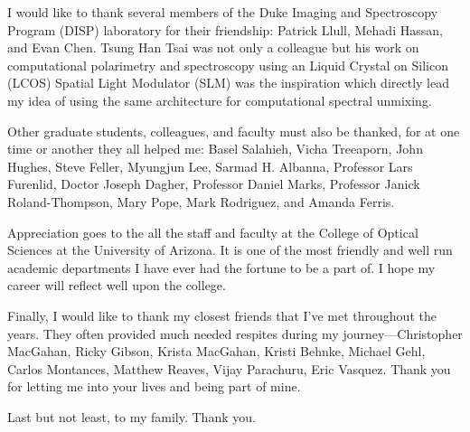 I would like to thank several members of the Duke Imaging and Spectroscopy Program (DISP) laboratory for their friendship: Patrick Llull, Mehadi Hassan, and Evan Chen. Tsung Han Tsai was not only a colleague but his work on computational polarimetry and spectroscopy using an Liquid Crystal on Silicon (LCOS) Spatial Light Modulator (SLM) was the inspiration which directly lead my idea of using the same architecture for computational spectral unmixing. 

Other graduate students, colleagues, and faculty must also be thanked, for at one time or another they all helped me: Basel Salahieh, Vicha Treeaporn, John Hughes, Steve Feller, Myungjun Lee, Sarmad H. Albanna, Professor Lars Furenlid, Doctor Joseph Dagher, Professor Daniel Marks, Professor Janick Roland-Thompson, Mary Pope, Mark Rodriguez, and Amanda Ferris. 

Appreciation goes to the all the staff and faculty at the College of Optical Sciences at the University of Arizona. It is one of the most friendly and well run academic departments I have ever had the fortune to be a part of. I hope my career will reflect well upon the college. 

Finally, I would like to thank my closest friends that I've met throughout the years. They often provided much needed respites during my journey---Christopher MacGahan, Ricky Gibson, Krista MacGahan, Kristi Behnke, Michael Gehl, Carlos Montances, Matthew Reaves, Vijay Parachuru, Eric Vasquez. Thank you for letting me into your lives and being part of mine.

Last but not least, to my family. Thank you. 